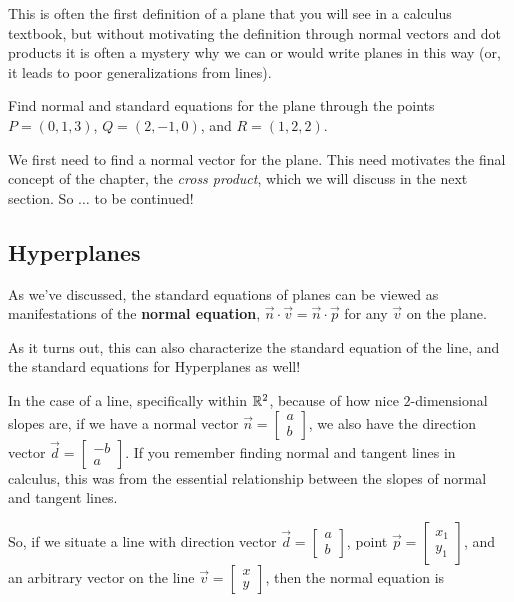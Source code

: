 \documentclass{ximera}
\begin{document}
This is often the first definition of a plane that you will see in a calculus textbook, but without motivating the definition through normal vectors and dot products it is often a mystery why we can or would write planes in this way (or, it leads to poor generalizations from lines).

\begin{example}\label{exa:normal-from-three-points}

  Find normal and standard equations for the plane through the points
  $P = (0,1,3)$, $Q=(2,-1,0)$, and $R=(1,2,2)$.
\end{example}

\begin{solution}
  We first need to find a normal vector for the plane. This need motivates the final concept of the chapter, the \emph{cross product}, which we will discuss in the next section. So $\ldots$ to be continued!

\end{solution}

\subsection*{Hyperplanes}

As we've discussed, the standard equations of planes can be viewed as manifestations of the {\bf normal equation}, $\vec{n}\cdot\vec{v}=\vec{n}\cdot\vec{p}$ for any $\vec{v}$ on the plane.

As it turns out, this can also characterize the standard equation of the line, and the standard equations for Hyperplanes as well!

In the case of a line, specifically within $\mathbb{R}^2$, because of how nice $2$-dimensional slopes are, if we have a normal vector $\vec{n}=\begin{bmatrix}
  a\\b
\end{bmatrix}$, we also have the direction vector $\vec{d}=\begin{bmatrix}
  -b\\a
\end{bmatrix}$. If you remember finding normal and tangent lines in calculus, this was from the essential relationship between the slopes of normal and tangent lines.

So, if we situate a line with direction vector $\vec{d}=\begin{bmatrix}
  a\\b
\end{bmatrix}$, point $\vec{p}=\begin{bmatrix}
  x_1\\y_1
\end{bmatrix}$, and an arbitrary vector on the line $\vec{v}=\begin{bmatrix}
  x\\y
\end{bmatrix}$, then the normal equation is
\end{document}
